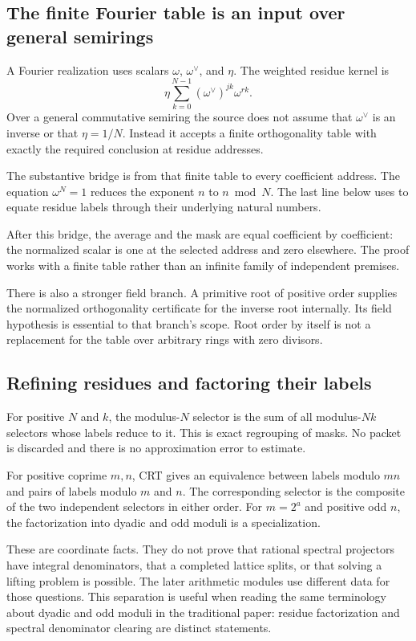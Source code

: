 \subsection{The finite Fourier table is an input over general semirings}

A Fourier realization uses scalars $\omega$, $\omega^\vee$, and $\eta$. The weighted residue kernel is
\[
\eta\sum_{k=0}^{N-1}(\omega^\vee)^{jk}\omega^{rk}.
\]
Over a general commutative semiring the source does not assume that $\omega^\vee$ is an inverse or that $\eta=1/N$. Instead it accepts a finite orthogonality table with exactly the required conclusion at residue addresses.

The substantive bridge is from that finite table to every coefficient address. The equation $\omega^N=1$ reduces the exponent $n$ to $n\bmod N$. The last line below uses  to equate residue labels through their underlying natural numbers.

After this bridge, the average and the mask are equal coefficient by coefficient: the normalized scalar is one at the selected address and zero elsewhere. The proof works with a finite table rather than an infinite family of independent premises.

There is also a stronger field branch. A primitive root of positive order supplies the normalized orthogonality certificate for the inverse root internally. Its field hypothesis is essential to that branch's scope. Root order by itself is not a replacement for the table over arbitrary rings with zero divisors.

\subsection{Refining residues and factoring their labels}

For positive $N$ and $k$, the modulus-$N$ selector is the sum of all modulus-$Nk$ selectors whose labels reduce to it. This is exact regrouping of masks. No packet is discarded and there is no approximation error to estimate.

For positive coprime $m,n$, CRT gives an equivalence between labels modulo $mn$ and pairs of labels modulo $m$ and $n$. The corresponding selector is the composite of the two independent selectors in either order. For $m=2^a$ and positive odd $n$, the factorization into dyadic and odd moduli is a specialization.

These are coordinate facts. They do not prove that rational spectral projectors have integral denominators, that a completed lattice splits, or that solving a lifting problem is possible. The later arithmetic modules use different data for those questions. This separation is useful when reading the same terminology about dyadic and odd moduli in the traditional paper: residue factorization and spectral denominator clearing are distinct statements.
